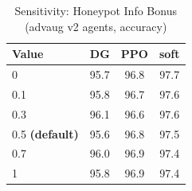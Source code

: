 \begin{table}[h]
\centering
\caption{Sensitivity: Honeypot Info Bonus (advaug v2 agents, accuracy)}
\label{tab:sensitivity_honeypot_info_bonus}
\begin{tabular}{lccc}
\toprule
Value & DG & PPO & soft \\
\midrule
  0 & 95.7 & 96.8 & 97.7 \\
  0.1 & 95.8 & 96.7 & 97.6 \\
  0.3 & 96.1 & 96.6 & 97.6 \\
  0.5 \textbf{(default)} & 95.6 & 96.8 & 97.5 \\
  0.7 & 96.0 & 96.9 & 97.4 \\
  1 & 95.8 & 96.9 & 97.4 \\
\bottomrule
\end{tabular}
\end{table}
